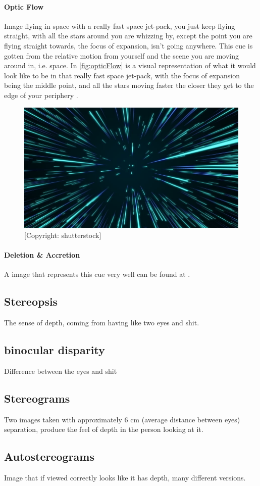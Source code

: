 			\paragraph{Optic Flow}
				Image flying in space with a really fast space jet-pack, you just keep flying straight, with all the stars around you are whizzing by, except the point you are flying straight towards, the focus of expansion, isn't going anywhere. This cue is gotten from the relative motion from yourself and the scene you are moving around in, i.e. space. In \autoref{fig:opticFlow} is a visual representation of what it would look like to be in that really fast space jet-pack, with the focus of expansion being the middle point, and all the stars moving faster the closer they get to the edge of your periphery \citep{sensationPerception}.
				\begin{figure}[H]
					\centering
					\includegraphics[width=0.7\linewidth]{figure/opticFlow}
					\caption{ [Copyright: shutterstock]}
					\label{fig:opticFlow}
				\end{figure}
			\paragraph{Deletion \& Accretion}
				A image that represents this cue very well can be found at \citep[p.~207]{sensationPerception}.
	
		\subsection{Stereopsis}
			The sense of depth, coming from having like two eyes and shit.
		\subsection{binocular disparity}
		Difference between the eyes and shit
		
		\subsection{Stereograms}
		Two images taken with approximately 6 cm (average distance between eyes) separation, produce the feel of depth in the person looking at it.
		
		\subsection{Autostereograms}
			Image that if viewed correctly looks like it has depth, many different versions.